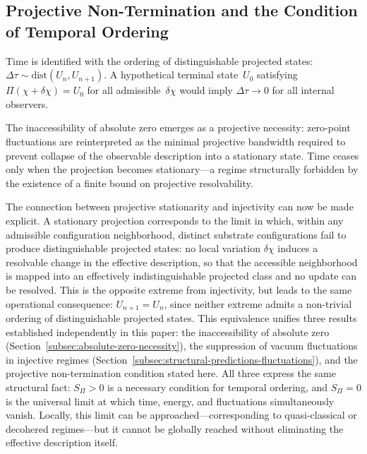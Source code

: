 \subsection{Projective Non-Termination and the Condition of Temporal Ordering}
  \label{subsec:projective-non-termination}

  Time is identified with the ordering of distinguishable projected states:
      $\Delta \tau \sim \mathrm{dist}(U_n, U_{n+1})$.
  A hypothetical terminal state~$U_0$ satisfying $\Pi(\chi + \delta\chi) = U_0$ for all admissible~$\delta\chi$ would
  imply $\Delta\tau \rightarrow 0$ for all internal observers.

  The inaccessibility of absolute zero emerges as a projective necessity:
  zero-point fluctuations are reinterpreted as the minimal projective
  bandwidth required to prevent collapse of the observable description into a stationary state.
  Time ceases only when the projection becomes stationary---a regime
  structurally forbidden by the existence of a finite bound on projective resolvability.

  The connection between projective stationarity and injectivity can now be made explicit.
  A stationary projection corresponds to the limit in which, within any admissible
  configuration neighborhood, distinct substrate configurations fail to produce
  distinguishable projected states: no local variation $\delta\chi$ induces a resolvable
  change in the effective description, so that the accessible neighborhood is mapped into an effectively
  indistinguishable projected class and no update can be resolved.
  This is the opposite extreme from injectivity, but leads to the same operational
  consequence: $U_{n+1} = U_n$, since neither extreme admits a non-trivial ordering of
  distinguishable projected states.
  This equivalence unifies three results established independently in this paper:
  the inaccessibility of absolute zero (Section~\ref{subsec:absolute-zero-necessity}),
  the suppression of vacuum fluctuations in injective regimes
  (Section~\ref{subsec:structural-predictions-fluctuations}),
  and the projective non-termination condition stated here.
  All three express the same structural fact: $S_\Pi > 0$ is a necessary condition
  for temporal ordering, and $S_\Pi = 0$ is the universal limit at which time, energy,
  and fluctuations simultaneously vanish.
  Locally, this limit can be approached---corresponding to quasi-classical or
  decohered regimes---but it cannot be globally reached without eliminating the effective description itself.
